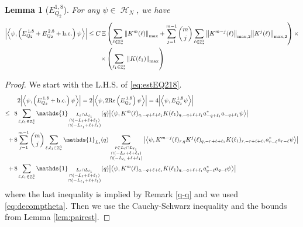\documentclass[sn-mathphys, Numbered ,a4paper]{sn-jnl}%
\DeclareMathOperator{\Z}{\mathbb{Z}}
\DeclareMathOperator{\HH}{\mathcal{H}}
\newcommand{\eva}[1]{\left\langle #1 \right\rangle}
\theoremstyle{plain}
\newtheorem{lemma}[theorem]{Lemma}
\theoremstyle{definition}
\theoremstyle{remark}
\theoremstyle{plain}
\theoremstyle{definition}
\theoremstyle{remark}
\begin{document}
\begin{lemma}[$E_{Q_2}^{1,8}$]
	For any $\psi \in \HH_N$, we have
	\begin{alignat}{2}
		\abs{\eva{\psi,\left(E^{\,1,8}_{Q_2}+E^{\,2,8}_{Q_2}+\mathrm{h.c.}\right) \psi }}
		\leq  C\, \Xi &\left(\sum\limits_{\ell \in \Z^3_*} \norm{K^m(\ell)}_{\mathrm{max}} + \sum\limits_{j=1}^{m-1} {{m}\choose j} \sum\limits_{ \ell\in \Z^3_*} \norm{K^{m-j}(\ell)}_{\mathrm{max,2}} \norm{K^j(\ell)}_{\mathrm{max,2}} \right) \times \nonumber\\\quad \times &\left(\sum\limits_{\ell_1 \in \Z^3_*} \norm{K(\ell_1)}_{\mathrm{max}}\right) \label{eq:estEQ218}  
	\end{alignat}
\end{lemma}
\begin{proof}
 We start with the L.H.S. of \eqref{eq:estEQ218}.
\begin{align}
	&2\abs{\eva{\psi,\left(E^{\,1,8}_{Q_2}+\mathrm{h.c.}\right) \psi }} = 2\abs{\eva{\psi,2\mathrm{Re}\left(E^{\,1,8}_{Q_2}\right) \psi }} = 4\abs{\eva{\psi, E^{\,1,8}_{Q_2} \psi }}\nonumber\\
	\leq\,\;8& \sum\limits_{\ell, \ell_1\in \Z^3_*} \mathds{1}_{\substack{L_{\ell}\cap L_{\ell_1}\\\cap (-L_{\ell}+\ell+\ell_1) \\ \cap (-L_{\ell_1}+\ell+\ell_1)}}(q) \abs{\eva{\psi, K^m(\ell)_{q,-q+\ell+\ell_1} K(\ell_1)_{q,-q+\ell+\ell_1} a^*_{-q+\ell_1}a_{-q+\ell_1} \psi }} \label{eq:EQ2181}\\
	+\,8& \sum\limits_{j=1}^{m-1} {{m}\choose j} \sum\limits_{\ell, \ell_1\in \Z^3_*}\mathds{1}_{L_{\ell}}(q) \sum\limits_{\substack{r\in L_{\ell} \cap L_{\ell_1}\\\cap (-L_{\ell}+\ell+\ell_1) \\ \cap (-L_{\ell_1}+\ell+\ell_1)}}  \abs{\eva{\psi, K^{m-j}(\ell)_{r,q} K^j(\ell)_{q,-r+\ell+\ell_1} K(\ell_1)_{r,-r+\ell+\ell_1} a^*_{r-\ell}a_{r-\ell} \psi }} \label{eq:EQ2182}\\
	+\,8&\sum\limits_{\ell, \ell_1\in \Z^3_*} \mathds{1}_{\substack{L_{\ell}\cap L_{\ell_1}\\\cap (-L_{\ell}+\ell+\ell_1) \\ \cap (-L_{\ell_1}+\ell+\ell_1)}} (q) \abs{\eva{\psi, K^m(\ell)_{q,-q+\ell+\ell_1}K(\ell_1)_{q,-q+\ell+\ell_1} a^*_{q-\ell}a_{q-\ell}\psi }} \label{eq:EQ2183}
\end{align}
where the last inequality is implied by Remark \ref{q-q} and we used \eqref{eq:decomptheta}. Then we use the Cauchy-Schwarz inequality and the bounds from Lemma \ref{lem:pairest}.

\end{proof}
\end{document}
